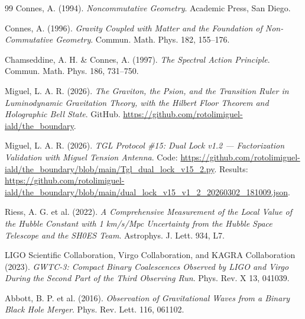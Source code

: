 \documentclass[12pt,a4paper,twoside]{article}
\begin{document}
\begin{thebibliography}{99}
Connes, A. (1994).
\textit{Noncommutative Geometry}.
Academic Press, San Diego.

Connes, A. (1996).
\textit{Gravity Coupled with Matter and the Foundation of Non-Commutative Geometry}.
Commun. Math. Phys. 182, 155--176.

Chamseddine, A. H. \& Connes, A. (1997).
\textit{The Spectral Action Principle}.
Commun. Math. Phys. 186, 731--750.

Miguel, L. A. R. (2026).
\textit{The Graviton, the Psion, and the Transition Ruler in Luminodynamic Gravitation Theory, with the Hilbert Floor Theorem and Holographic Bell State}.
GitHub. \url{https://github.com/rotolimiguel-iald/the_boundary}.

Miguel, L. A. R. (2026).
\textit{TGL Protocol \#15: Dual Lock v1.2 --- Factorization Validation with Miguel Tension Antenna}.
Code: \url{https://github.com/rotolimiguel-iald/the_boundary/blob/main/Tgl_dual_lock_v15_2.py}.
Results: \url{https://github.com/rotolimiguel-iald/the_boundary/blob/main/dual_lock_v15_v1_2_20260302_181009.json}.

Riess, A. G. et al. (2022).
\textit{A Comprehensive Measurement of the Local Value of the Hubble Constant with 1 km/s/Mpc Uncertainty from the Hubble Space Telescope and the SH0ES Team}.
Astrophys. J. Lett. 934, L7.

LIGO Scientific Collaboration, Virgo Collaboration, and KAGRA Collaboration (2023).
\textit{GWTC-3: Compact Binary Coalescences Observed by LIGO and Virgo During the Second Part of the Third Observing Run}.
Phys. Rev. X 13, 041039.

Abbott, B. P. et al. (2016).
\textit{Observation of Gravitational Waves from a Binary Black Hole Merger}.
Phys. Rev. Lett. 116, 061102.

\end{thebibliography}
\end{document}
